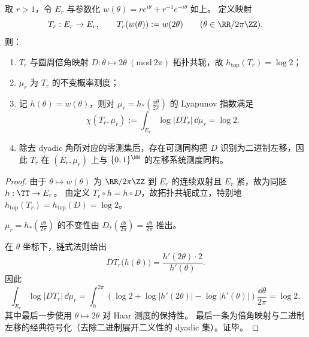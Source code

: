 \begin{theorem}\label{thm:group-jg-leyang-ellipse-doubling-shift}
取 \(r>1\)，令 \(E_r\) 与参数化 \(w(\theta)=r e^{i\theta}+r^{-1}e^{-i\theta}\) 如上。
定义映射
\[
T_r:E_r\to E_r,\qquad T_r(w(\theta)):=w(2\theta)\qquad(\theta\in\RR/2\pi\ZZ).
\]
则：
\begin{enumerate}
  \item \(T_r\) 与圆周倍角映射 \(D:\theta\mapsto 2\theta\ (\mathrm{mod}\ 2\pi)\) 拓扑共轭，故 \(h_{\mathrm{top}}(T_r)=\log 2\)；
  \item \(\mu_r\) 为 \(T_r\) 的不变概率测度；
  \item 记 \(h(\theta)=w(\theta)\)，则对 \(\mu_r=h_\ast(\frac{\dd\theta}{2\pi})\) 的 Lyapunov 指数满足
  \[
  \chi(T_r,\mu_r):=\int_{E_r}\log|DT_r|\,\dd\mu_r=\log 2.
  \]
  \item 除去 dyadic 角所对应的零测集后，存在可测同构把 \(D\) 识别为二进制左移，因此 \(T_r\) 在 \((E_r,\mu_r)\) 上与 \(\{0,1\}^{\NN}\) 的左移系统测度同构。
\end{enumerate}
\end{theorem}

\begin{proof}
由于 \(\theta\mapsto w(\theta)\) 为 \(\RR/2\pi\ZZ\) 到 \(E_r\) 的连续双射且 \(E_r\) 紧，故为同胚 \(h:\TT\to E_r\)。
由定义 \(T_r\circ h=h\circ D\)，故拓扑共轭成立，特别地 \(h_{\mathrm{top}}(T_r)=h_{\mathrm{top}}(D)=\log 2\)。
\par
\(\mu_r=h_\ast(\frac{\dd\theta}{2\pi})\) 的不变性由
\(
D_\ast(\frac{\dd\theta}{2\pi})=\frac{\dd\theta}{2\pi}
\)
推出。
\par
在 \(\theta\) 坐标下，链式法则给出
\[
DT_r\bigl(h(\theta)\bigr)=\frac{h'(2\theta)\cdot 2}{h'(\theta)}.
\]
因此
\[
\int_{E_r}\log|DT_r|\,\dd\mu_r
=\int_{0}^{2\pi}\left(\log 2+\log|h'(2\theta)|-\log|h'(\theta)|\right)\frac{\dd\theta}{2\pi}
=\log 2,
\]
其中最后一步使用 \(\theta\mapsto 2\theta\) 对 Haar 测度的保持性。
最后一条为倍角映射与二进制左移的经典符号化（去除二进制展开二义性的 dyadic 集）。证毕。
\end{proof}
